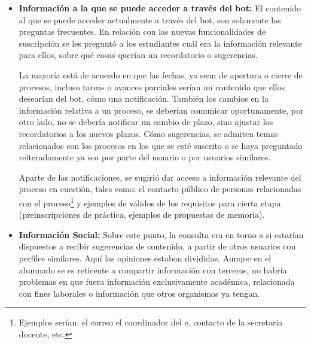     \begin{itemize}
        \item \textbf{Información a la que se puede acceder a través del bot:} El contenido al que se puede acceder actualmente a través del bot, son solamente las preguntas frecuentes. En relación con las nuevas funcionalidades de suscripción se les preguntó a los estudiantes cuál era la información relevante para ellos, sobre qué cosas querían un recordatorio o sugerencias.
        
        \par La mayoría está de acuerdo en que las fechas, ya sean de apertura o cierre de procesos, incluso tareas o avances parciales serían un contenido que ellos desearían del bot, cómo una notificación. También los cambios en la información relativa a un proceso, se deberían comunicar oportunamente, por otro lado, no se debería notificar un cambio de plazo, sino ajustar los recordatorios a los nuevos plazos. Cómo sugerencias, se admiten temas relacionados con los procesos en los que se esté suscrito o se haya preguntado reiteradamente ya sea por parte del usuario o por usuarios \guillemotleft similares\guillemotright.
        
        \par Aparte de las notificaciones, se sugirió dar acceso a información relevante del proceso en cuestión, tales como: el contacto público de personas relacionadas con el proceso\footnote{Ejemplos serían: el correo el coordinador del \acrshort{e}, contacto de la secretaria docente, etc.} y ejemplos de válidos de los requisitos para cierta etapa (preinscripciones de práctica, ejemplos de propuestas de memoria).

        \item \textbf{Información Social:} Sobre este punto, la consulta era en torno a si estarían dispuestos a recibir sugerencias de contenido, a partir de otros usuarios con perfiles similares.
        Aquí las opiniones estaban divididas. Aunque en el alumnado se es reticente a compartir información con terceros, no habría problemas en que fuera información exclusivamente académica, relacionada con fines laborales o información que otros organismos ya tengan.


\end{itemize}
